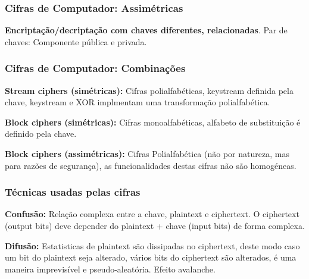 \documentclass{article}
\begin{document}
\subsubsection{Cifras de Computador: Assimétricas}

\begin{flushleft}
  \textbf{Encriptação/decriptação com chaves diferentes, relacionadas}.
  Par de chaves: Componente pública e privada.
\end{flushleft}

\subsubsection{Cifras de Computador: Combinações}

\begin{flushleft}
  \textbf{Stream ciphers (simétricas):} Cifras polialfabéticas, keystream
  definida pela chave, keystream e XOR implmentam uma transformação polialfabética.

  \vspace{2mm}

  \textbf{Block ciphers (simétricas):} Cifras monoalfabéticas, alfabeto de substituição
  é definido pela chave.

  \vspace{2mm}

  \textbf{Block ciphers (assimétricas):} Cifras Polialfabética (não por natureza,
  mas para razões de segurança), as funcionalidades destas cifras não são
  homogéneas.
\end{flushleft}

\pagebreak

\subsubsection{Técnicas usadas pelas cifras}

\begin{flushleft}
  \textbf{Confusão:} Relação complexa entre a chave, plaintext e ciphertext.
  O ciphertext (output bits) deve depender do plaintext + chave (input bits) de forma complexa.

  \vspace{2mm}
  
  \textbf{Difusão:} Estatisticas de plaintext são dissipadas no ciphertext, deste modo
  caso um bit do plaintext seja alterado, vários bits do ciphertext são alterados,
  é uma maneira imprevisível e pseudo-aleatória. Efeito avalanche.
\end{flushleft}
\end{document}
